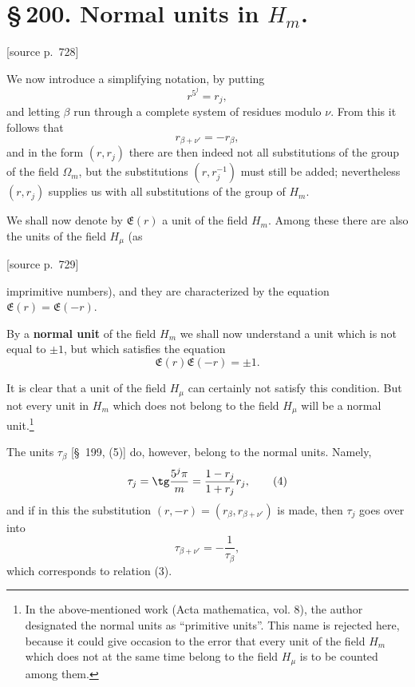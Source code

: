\documentclass[11pt]{article}
\newcommand{\srcpage}[1]{\par\medskip\noindent\textsf{[source p.~#1]}\par\smallskip}
\begin{document}
\section*{\S\,200. Normal units in $H_m$.}

\srcpage{728}
We now introduce a simplifying notation, by putting
\begin{equation}
r^{5^j}=r_j,
\tag{1}
\end{equation}
and letting $\beta$ run through a complete system of residues modulo $\nu$. From this it follows that
\begin{equation}
r_{\beta+\nu'}=-r_\beta,
\tag{2}
\end{equation}
and in the form $(r,r_j)$ there are then indeed not all substitutions of the group of the field $\Omega_m$, but the substitutions $(r,r_j^{-1})$ must still be added; nevertheless $(r,r_j)$ supplies us with all substitutions of the group of $H_m$.

We shall now denote by $\mathfrak E(r)$ a unit of the field $H_m$. Among these there are also the units of the field $H_\mu$ (as
\srcpage{729}
imprimitive numbers), and they are characterized by the equation $\mathfrak E(r)=\mathfrak E(-r)$.

By a \textbf{normal unit} of the field $H_m$ we shall now understand a unit which is not equal to $\pm1$, but which satisfies the equation
\begin{equation}
\mathfrak E(r)\mathfrak E(-r)=\pm1.
\tag{3}
\end{equation}

It is clear that a unit of the field $H_\mu$ can certainly not satisfy this condition. But not every unit in $H_m$ which does not belong to the field $H_\mu$ will be a normal unit.\footnote{In the above-mentioned work (Acta mathematica, vol. 8), the author designated the normal units as ``primitive units''. This name is rejected here, because it could give occasion to the error that every unit of the field $H_m$ which does not at the same time belong to the field $H_\mu$ is to be counted among them.}

The units $\tau_\beta$ [\S~199, (5)] do, however, belong to the normal units. Namely,
\begin{equation}
\tau_j=\tg\frac{5^j\pi}{m}=\frac{1-r_j}{1+r_j}r_j,
\tag{4}
\end{equation}
and if in this the substitution $(r,-r)=(r_\beta,r_{\beta+\nu'})$ is made, then $\tau_j$ goes over into
\begin{equation}
\tau_{\beta+\nu'}=-\frac1{\tau_\beta},
\tag{5}
\end{equation}
which corresponds to relation (3).
\end{document}

